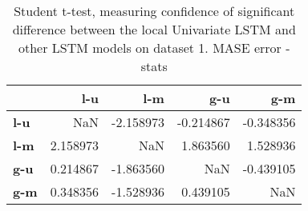 \begin{table}[h]
\centering
\caption{Student t-test, measuring confidence of significant difference between the local Univariate LSTM and other LSTM models on dataset 1. MASE error - stats}
\label{table:ttest-stats-lstm-experiments-MASE-dataset-1}
\begin{tabular}{lrrrr}
\toprule
{} &       l-u &       l-m &       g-u &       g-m \\
\midrule
\textbf{l-u} &       NaN & -2.158973 & -0.214867 & -0.348356 \\
\textbf{l-m} &  2.158973 &       NaN &  1.863560 &  1.528936 \\
\textbf{g-u} &  0.214867 & -1.863560 &       NaN & -0.439105 \\
\textbf{g-m} &  0.348356 & -1.528936 &  0.439105 &       NaN \\
\bottomrule
\end{tabular}
\end{table}
